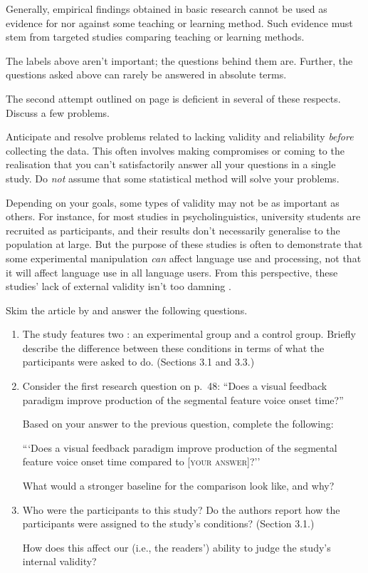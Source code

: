 Generally, empirical findings obtained in basic research cannot be used
as evidence for nor against some teaching or learning method.
Such evidence must stem from targeted studies comparing teaching or learning
methods.
\parend
\medskip

The labels above aren't important; the questions behind them are.
Further, the questions asked above can rarely be answered in absolute terms.

The second attempt outlined on page \pageref{sec:beispiel} is deficient 
in several of these respects. Discuss a few problems.
\parend

\begin{framed}
 Anticipate and resolve problems
related to lacking validity and reliability
\emph{before} collecting the data. This often
involves making compromises or coming to the
realisation that you can't satisfactorily
answer all your questions in a single study.
Do \emph{not} assume that some statistical method
will solve your problems.
\end{framed}

Depending on your goals, some types of validity
may not be as important as others.
For instance, for most studies in psycholinguistics,
university students are recruited as participants,
and their results don't necessarily generalise
to the population at large. But the purpose of these
studies is often to demonstrate that some
experimental manipulation \emph{can} affect
language use and processing, not that
it will affect language use in all language users.
From this perspective, these studies' lack
of external validity isn't too damning \citep{Mook1983}.

  Skim the article by \citet{Offerman2016}
  and answer the following questions.
  
  \begin{enumerate}
    \item The study features two :
    an experimental group and a control group.
    Briefly describe the difference between these conditions in terms
    of what the participants were asked to do. (Sections 3.1 and 3.3.)
    
    \item Consider the first research question on p.~48:
    ``Does a visual feedback paradigm improve production of the segmental
    feature voice onset time?''
    
    Based on your answer to the previous question, complete the following:
    
    ```Does a visual feedback paradigm improve production of the segmental
    feature voice onset time compared to [\textsc{your answer}]?''
    
    What would a stronger baseline for the comparison look like, and why?
    
    \item Who were the participants to this study? 
    Do the authors report how the participants were assigned to the study's
    conditions? (Section 3.1.) 
    
    How does this affect our (i.e., the readers') ability to judge the study's
    internal validity?
    \parend
  \end{enumerate}
  
